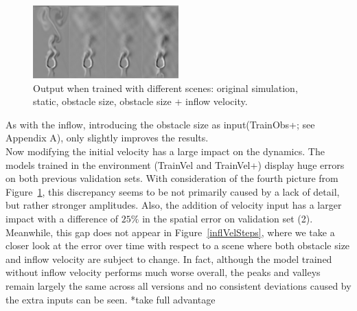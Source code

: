 \documentclass[sigconf]{acmart}
\begin{document}
\begin{figure}
	\includegraphics[width=0.5\textwidth]{imgs/addinputs_comparison.png}
	\caption{Output when trained with different scenes: original simulation, static, obstacle size, obstacle size  + inflow velocity.}
	\label{addinputs_img}
\end{figure}
As with the inflow, introducing the obstacle size as input(TrainObs+; see Appendix A), only slightly improves the results.\\
Now modifying the initial velocity has a large impact on the dynamics. The models trained in the environment (TrainVel and TrainVel+) display huge errors on both previous validation sets. With consideration of the fourth picture from Figure~\ref{addinputs_img}, this discrepancy seems to be not primarily caused by a lack of detail, but rather stronger amplitudes. Also, the addition of velocity input has a larger impact with a difference of $25\%$ in the spatial error on validation set (2).
Meanwhile, this gap does not appear in Figure~\ref{inflVelSteps}, where we take a closer look at the error over time with respect to a scene where both obstacle size and inflow velocity are subject to change.
In fact, although the model trained without inflow velocity performs much worse overall, the peaks and valleys remain largely the same across all versions and no consistent deviations caused by the extra inputs can be seen.
*take full advantage
\end{document}
